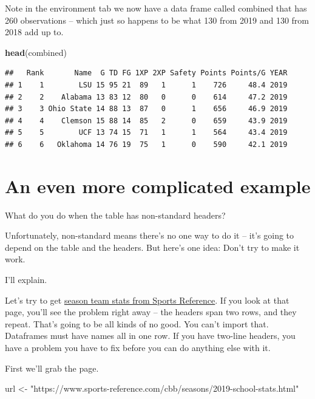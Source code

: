 \documentclass[]{book}
\newenvironment{Shaded}{\begin{snugshade}}{\end{snugshade}}
\newcommand{\KeywordTok}[1]{\textcolor[rgb]{0.13,0.29,0.53}{\textbf{#1}}}
\newcommand{\NormalTok}[1]{#1}
\newcommand{\StringTok}[1]{\textcolor[rgb]{0.31,0.60,0.02}{#1}}
\begin{document}
Note in the environment tab we now have a data frame called combined that has 260 observations -- which just so happens to be what 130 from 2019 and 130 from 2018 add up to.

\begin{Shaded}
\begin{Highlighting}[]
\KeywordTok{head}\NormalTok{(combined)}
\end{Highlighting}
\end{Shaded}

\begin{verbatim}
##   Rank       Name  G TD FG 1XP 2XP Safety Points Points/G YEAR
## 1    1        LSU 15 95 21  89   1      1    726     48.4 2019
## 2    2    Alabama 13 83 12  80   0      0    614     47.2 2019
## 3    3 Ohio State 14 88 13  87   0      1    656     46.9 2019
## 4    4    Clemson 15 88 14  85   2      0    659     43.9 2019
## 5    5        UCF 13 74 15  71   1      1    564     43.4 2019
## 6    6   Oklahoma 14 76 19  75   1      0    590     42.1 2019
\end{verbatim}

\hypertarget{an-even-more-complicated-example}{%
\section{An even more complicated example}\label{an-even-more-complicated-example}}

What do you do when the table has non-standard headers?

Unfortunately, non-standard means there's no one way to do it -- it's going to depend on the table and the headers. But here's one idea: Don't try to make it work.

I'll explain.

Let's try to get \href{https://www.sports-reference.com/cbb/seasons/2019-school-stats.html}{season team stats from Sports Reference}. If you look at that page, you'll see the problem right away -- the headers span two rows, and they repeat. That's going to be all kinds of no good. You can't import that. Dataframes must have names all in one row. If you have two-line headers, you have a problem you have to fix before you can do anything else with it.

First we'll grab the page.

\begin{Shaded}
\begin{Highlighting}[]
\NormalTok{url <-}\StringTok{ "https://www.sports-reference.com/cbb/seasons/2019-school-stats.html"}
\end{Highlighting}
\end{Shaded}
\end{document}
